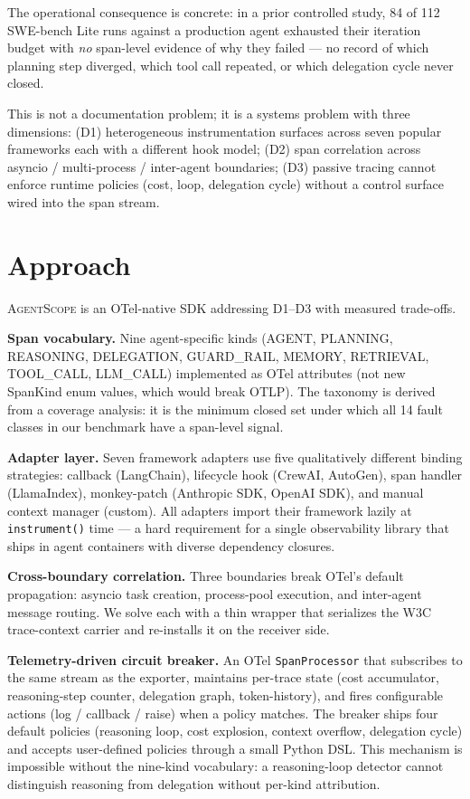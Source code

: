 \documentclass[sigplan,10pt,anonymous,review]{acmart}
\newcommand{\sysname}{\textsc{AgentScope}\xspace}
\begin{document}
The operational consequence is concrete: in a prior controlled study,
84 of 112 SWE-bench Lite runs against a production agent exhausted
their iteration budget with \emph{no} span-level evidence of why
they failed --- no record of which planning step diverged, which tool
call repeated, or which delegation cycle never closed.

This is not a documentation problem; it is a systems problem with
three dimensions: (D1) heterogeneous instrumentation surfaces across
seven popular frameworks each with a different hook model;
(D2) span correlation across asyncio / multi-process / inter-agent
boundaries; (D3) passive tracing cannot enforce runtime policies
(cost, loop, delegation cycle) without a control surface wired into
the span stream.

\section*{Approach}

\sysname{} is an OTel-native SDK addressing D1--D3 with measured
trade-offs.

\textbf{Span vocabulary.} Nine agent-specific kinds (AGENT, PLANNING,
REASONING, DELEGATION, GUARD\_RAIL, MEMORY, RETRIEVAL, TOOL\_CALL,
LLM\_CALL) implemented as OTel attributes (not new SpanKind enum
values, which would break OTLP). The taxonomy is derived from a
coverage analysis: it is the minimum closed set under which all 14
fault classes in our benchmark have a span-level signal.

\textbf{Adapter layer.} Seven framework adapters use five qualitatively
different binding strategies: callback (LangChain), lifecycle hook
(CrewAI, AutoGen), span handler (LlamaIndex), monkey-patch (Anthropic
SDK, OpenAI SDK), and manual context manager (custom). All adapters
import their framework lazily at \texttt{instrument()} time --- a hard
requirement for a single observability library that ships in agent
containers with diverse dependency closures.

\textbf{Cross-boundary correlation.} Three boundaries break OTel's
default propagation: asyncio task creation, process-pool execution,
and inter-agent message routing. We solve each with a thin wrapper
that serializes the W3C trace-context carrier and re-installs it on
the receiver side.

\textbf{Telemetry-driven circuit breaker.} An OTel
\texttt{SpanProcessor} that subscribes to the same stream as the
exporter, maintains per-trace state (cost accumulator, reasoning-step
counter, delegation graph, token-history), and fires configurable
actions (log / callback / raise) when a policy matches. The breaker
ships four default policies (reasoning loop, cost explosion, context
overflow, delegation cycle) and accepts user-defined policies through
a small Python DSL. This mechanism is impossible without the
nine-kind vocabulary: a reasoning-loop detector cannot distinguish
reasoning from delegation without per-kind attribution.
\end{document}
